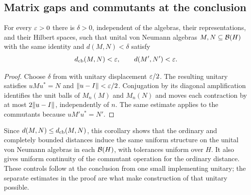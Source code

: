 \subsection{Matrix gaps and commutants at the conclusion}

\begin{corollary}\label{cor:uniform-matrix-commutant}
For every $\varepsilon>0$ there is $\delta>0$, independent of the algebras,
their representations, and their Hilbert spaces, such that unital von
Neumann algebras $M,N\subseteq\mathcal B(H)$ with the same identity and
$d(M,N)<\delta$ satisfy
\[
 d_{\mathrm{cb}}(M,N)<\varepsilon,\qquad d(M',N')<\varepsilon.
\]
\end{corollary}

\begin{proof}
Choose $\delta$ from  with unitary displacement
$\varepsilon/2$. The resulting unitary satisfies $uMu^*=N$ and
$\lVert u-I\rVert<\varepsilon/2$. Conjugation by its diagonal amplification
identifies the unit balls of $M_n(M)$ and $M_n(N)$ and moves each
contraction by at most $2\lVert u-I\rVert$, independently of $n$.
The same estimate applies to the commutants because $uM'u^*=N'$.
\end{proof}

Since $d(M,N)\le d_{\mathrm{cb}}(M,N)$, this corollary shows that the ordinary
and completely bounded distances induce the same uniform structure on
the unital von Neumann algebras in each $\mathcal B(H)$, with tolerances uniform
over $H$.
It also gives uniform continuity of the commutant operation for the
ordinary distance. These controls follow at the conclusion from one
small implementing unitary; the separate estimates in the proof are
what make construction of that unitary possible.
